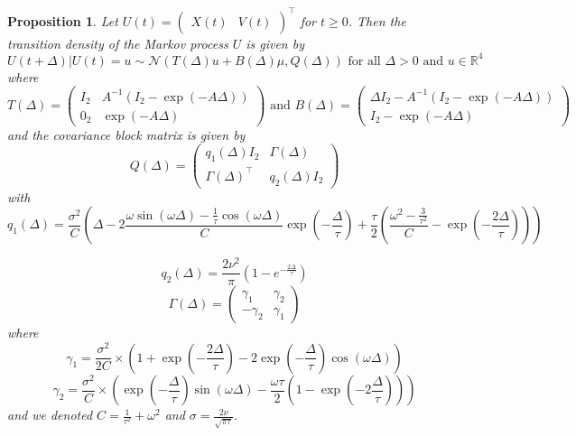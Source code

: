 \documentclass[11pt]{article}
\newcommand {\R}{\mathbb{R}}
\newcommand {\1}{\mathbb{1}}
\newtheorem{proposition}{Proposition}[section]
\theoremstyle{definition}
\theoremstyle{remark}
\theoremstyle{remark}
\begin{document}
\begin{proposition}
	Let $U(t)=\begin{pmatrix} X(t) & V(t) \end{pmatrix}^\top$ for $t \geq 0$. Then the transition density of the Markov process $U$ is given by 
	\begin{equation}
		U(t+\Delta) \vert U(t)=u \sim \mathcal{N}\left( T(\Delta) u +B(\Delta)\mu, Q(\Delta)\right) \mbox{ for all } \Delta>0 \mbox{ and } u \in \R^4
		\label{eq: X V distribution}
	\end{equation}
where \begin{equation}
	T(\Delta)=\begin{pmatrix} I_2 & A^{-1}(I_2-\exp(-A\Delta)) \\
	0_2 & \exp(-A\Delta) \end{pmatrix} \mbox{ and } B(\Delta)=\begin{pmatrix}
	\Delta I_2 -A^{-1}(I_2-\exp(-A\Delta))\\
	I_2-\exp(-A\Delta)\end{pmatrix}
	\label{eq: link matrices}
	\end{equation}
and the covariance block matrix is given by
\begin{equation}
	Q(\Delta)=\begin{pmatrix}
		q_1(\Delta)I_2 & \Gamma(\Delta) \\
		\Gamma(\Delta)^\top & q_2(\Delta)I_2
	\end{pmatrix}
	\label{eq: covariance matrix}
\end{equation}
with 
\begin{equation}q_1(\Delta)=\frac{\sigma^2}{C}\left( \Delta-2 \frac{\omega \sin(\omega \Delta)-\frac{1}{\tau} \cos(\omega \Delta)}{C} \exp\left( -\frac{\Delta}{\tau} \right) +\frac{\tau}{2} \left( \frac{\omega^2-\frac{3}{\tau^2}}{C}-\exp\left( -\frac{2\Delta}{\tau}\right)\right) \right)
\end{equation}

\begin{equation}
	q_2(\Delta)=\frac{2\nu^2}{\pi}\left(1-e^{-\frac{2 \Delta}{\tau}}\right)
\end{equation}
\begin{equation}\Gamma(\Delta)=\begin{pmatrix} \gamma_1 & \gamma_2 \\
	-\gamma_2 & \gamma_1\end{pmatrix}
\end{equation}
where
\begin{equation}\gamma_1=\frac{\sigma^2}{2 C } \times \left( 1+\exp\left( -\frac{2\Delta}{\tau}\right)-2\exp\left( -\frac{\Delta}{\tau}\right) \cos(\omega\Delta)\right)
\end{equation}
\begin{equation}\gamma_2=\frac{\sigma^2}{C} \times\left( \exp\left( -\frac{\Delta}{\tau}\right) \sin(\omega \Delta)-\frac{\omega \tau}{2} \left(1-\exp\left( -2 \frac{\Delta}{\tau}\right) \right)\right)
\end{equation}
and we denoted $C=\frac{1}{\tau^2}+\omega^2$ and $\sigma=\frac{2\nu}{\sqrt{\pi \tau}}$.
\label{prop: transition density}
\end{proposition}
\end{document}
